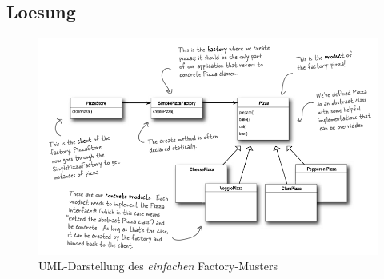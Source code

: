 \subsection{Loesung}



\begin{figure}
	\centering
	\includegraphics[width=\linewidth]{factory/img/simpleFactoryUML}
	\caption{UML-Darstellung des \emph{einfachen} Factory-Musters}
	\label{fig:simpleFactoryUML}
\end{figure}

